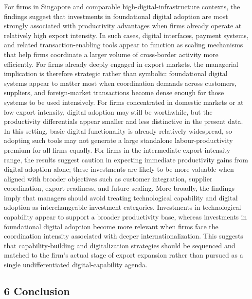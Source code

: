 \documentclass[12pt,a4paper]{article}
\begin{document}
For firms in Singapore and comparable high-digital-infrastructure
contexts, the findings suggest that investments in foundational digital
adoption are most strongly associated with productivity advantages when
firms already operate at relatively high export intensity. In such
cases, digital interfaces, payment systems, and related
transaction-enabling tools appear to function as scaling mechanisms that
help firms coordinate a larger volume of cross-border activity more
efficiently. For firms already deeply engaged in export markets, the
managerial implication is therefore strategic rather than symbolic:
foundational digital systems appear to matter most when coordination
demands across customers, suppliers, and foreign-market transactions
become dense enough for those systems to be used intensively. For firms
concentrated in domestic markets or at low export intensity, digital
adoption may still be worthwhile, but the productivity differentials
appear smaller and less distinctive in the present data. In this
setting, basic digital functionality is already relatively widespread,
so adopting such tools may not generate a large standalone
labour-productivity premium for all firms equally. For firms in the
intermediate export-intensity range, the results suggest caution in
expecting immediate productivity gains from digital adoption alone;
these investments are likely to be more valuable when aligned with
broader objectives such as customer integration, supplier coordination,
export readiness, and future scaling. More broadly, the findings imply
that managers should avoid treating technological capability and digital
adoption as interchangeable investment categories. Investments in
technological capability appear to support a broader productivity base,
whereas investments in foundational digital adoption become more
relevant when firms face the coordination intensity associated with
deeper internationalization. This suggests that capability-building and
digitalization strategies should be sequenced and matched to the firm's
actual stage of export expansion rather than pursued as a single
undifferentiated digital-capability agenda.

\hypertarget{6-conclusion}{%
\subsection{6 Conclusion}\label{6-conclusion}}
\end{document}

